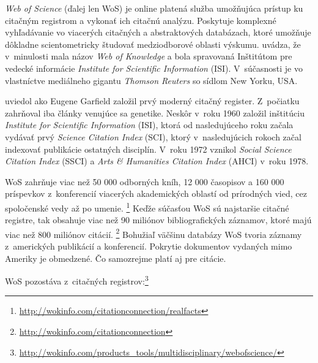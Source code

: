 \emph{Web of Science} (ďalej len WoS) je online platená služba umožňujúca prístup ku
citačným registrom a vykonať ich citačnú analýzu.  Poskytuje komplexné vyhľadávanie vo
viacerých citačných a abstraktových databázach, ktoré umožňuje dôkladne
scientometricky študovať medziodborové oblasti výskumu. \citet{Drake2005}
uvádza, že v~minulosti mala názov \emph{Web of Knowledge} a bola spravovaná
Inštitútom pre vedecké informácie \emph{Institute for Scientific Information}
(ISI).  V~súčasnosti je vo vlastníctve mediálneho gigantu \emph{Thomson Reuters}
so sídlom New Yorku, USA.

\citet{Smith2012} uviedol ako Eugene Garfield založil prvý moderný citačný
register.  Z~počiatku zahrňoval iba články venujúce sa genetike.  Neskôr v~roku
1960 založil inštitúciu \emph{Institute for Scientific Information} (ISI),
ktorá od nasledujúceho roku začala vydávať prvý  \emph{Science Citation Index} (SCI), ktorý v~nasledujúcich rokoch začal
indexovať publikácie ostatných disciplín.  V~roku 1972 vznikol  \emph{Social Science Citation Index} (SSCI) a
 \emph{Arts \& Humanities
Citation Index} (AHCI) v~roku 1978.

WoS zahrňuje viac než 50 000 odborných kníh, 12 000 časopisov a 160 000
príspevkov z~konferencií viacerých akademických oblastí od prírodných vied, cez
spoločenské vedy až po umenie.
\footnote{\url{http://wokinfo.com/citationconnection/realfacts}} Keďže súčasťou
WoS sú najstaršie citačné registre, tak obsahuje viac než 90 miliónov
bibliografických záznamov, ktoré majú viac než 800 miliónov citácií.
\footnote{\url{http://wokinfo.com/citationconnection}} Bohužiaľ väčšinu
databázy WoS tvoria záznamy z~amerických publikácií a konferencií. Pokrytie
dokumentov vydaných mimo Ameriky je obmedzené.  Čo samozrejme platí aj pre
citácie.

WoS pozostáva z~citačných registrov:\footnote{\url{http://wokinfo.com/products_tools/multidisciplinary/webofscience/}}

